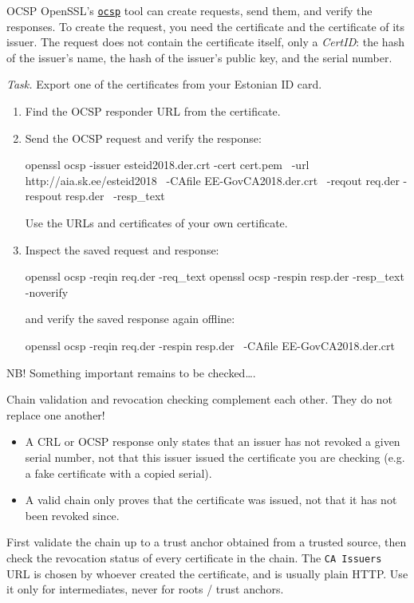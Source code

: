 \documentclass{practice}
\begin{document}
\begin{task}{OCSP}
  OpenSSL's \href{https://docs.openssl.org/master/man1/openssl-ocsp/}{\texttt{ocsp}} tool can create requests, send them, and verify the responses.
  To create the request, you need the certificate and the certificate of its issuer.
  The request does not contain the certificate itself, only a \emph{CertID}: the hash of the issuer's name, the hash of the issuer's public key, and the serial number.

  \textit{Task.}
  Export one of the certificates from your Estonian ID card.

  \begin{enumerate}
    \item Find the OCSP responder URL from the certificate.

    \item Send the OCSP request and verify the response:
    \begin{cmdblock}
openssl ocsp -issuer esteid2018.der.crt -cert cert.pem \
  -url http://aia.sk.ee/esteid2018 \
  -CAfile EE-GovCA2018.der.crt \
  -reqout req.der -respout resp.der \
  -resp_text
    \end{cmdblock}
    Use the URLs and certificates of your own certificate.

    \item Inspect the saved request and response:
    \begin{cmdblock}
openssl ocsp -reqin req.der -req_text
openssl ocsp -respin resp.der -resp_text -noverify
    \end{cmdblock}
    and verify the saved response again offline:
    \begin{cmdblock}
openssl ocsp -reqin req.der -respin resp.der \
  -CAfile EE-GovCA2018.der.crt
    \end{cmdblock}
  \end{enumerate}

  NB! Something important remains to be checked\dots.
\end{task}

\vspace*{1em}
\begin{tcolorbox}[title=Good practice]
  Chain validation and revocation checking complement each other.
  They do not replace one another!
  \begin{itemize}
    \item A CRL or OCSP response only states that an issuer has not revoked a given serial number, not that this issuer issued the certificate you are checking (e.g. a fake certificate with a copied serial).
    \item A valid chain only proves that the certificate was issued, not that it has not been revoked since.
  \end{itemize}
  First validate the chain up to a trust anchor obtained from a trusted source, then check the revocation status of every certificate in the chain.
  \tcblower
  The \texttt{CA Issuers} URL is chosen by whoever created the certificate, and is usually plain HTTP.
  Use it only for intermediates, never for roots / trust anchors.
\end{tcolorbox}
\end{document}
